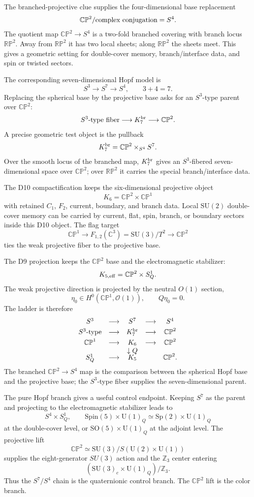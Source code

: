 \documentclass[11pt]{article}
\theoremstyle{definition}
\theoremstyle{remark}
\newcommand{\SU}{\mathrm{SU}}
\newcommand{\U}{\mathrm{U}}
\newcommand{\SO}{\mathrm{SO}}
\newcommand{\CP}{\mathbb{CP}}
\newcommand{\C}{\mathbb{C}}
\newcommand{\Z}{\mathbb{Z}}
\newcommand{\cO}{\mathcal O}
\begin{document}
The branched-projective clue supplies the four-dimensional base replacement
\[
  \CP^2/\hbox{complex conjugation}=S^4.
\]
The quotient map \(\CP^2\to S^4\) is a two-fold branched covering with branch
locus \(\mathbb{RP}^2\).  Away from \(\mathbb{RP}^2\) it has two local sheets;
along \(\mathbb{RP}^2\) the sheets meet.  This gives a geometric setting for
double-cover memory, branch/interface data, and spin or twisted sectors.

The corresponding seven-dimensional Hopf model is
\[
  S^3\longrightarrow S^7\longrightarrow S^4,
  \qquad 3+4=7.
\]
Replacing the spherical base by the projective base asks for an
\(S^3\)-type parent over \(\CP^2\):
\[
  S^3\hbox{-type fiber}\longrightarrow K_7^{\rm br}\longrightarrow\CP^2.
\]
A precise geometric test object is the pullback
\[
  K_7^{\rm br}=\CP^2\times_{S^4}S^7.
\]
Over the smooth locus of the branched map, \(K_7^{\rm br}\) gives an
\(S^3\)-fibered seven-dimensional space over \(\CP^2\); over
\(\mathbb{RP}^2\) it carries the special branch/interface data.

The D10 compactification keeps the six-dimensional projective object
\[
  K_6=\CP^2\times\CP^1
\]
with retained \(C_1\), \(F_2\), current, boundary, and branch data.  Local
\(\SU(2)\) double-cover memory can be carried by current, flat, spin, branch,
or boundary sectors inside this D10 object.  The flag target
\[
  \CP^1\longrightarrow F_{1,2}(\C^3)=\SU(3)/T^2\longrightarrow\CP^2
\]
ties the weak projective fiber to the projective base.

The D9 projection keeps the \(\CP^2\) base and the electromagnetic stabilizer:
\[
  K_{5,{\rm eff}}=\CP^2\times S^1_Q.
\]
The weak projective direction is projected by the neutral \(O(1)\) section,
\[
  \eta_0\in H^0(\CP^1,\cO(1)),
  \qquad Q\eta_0=0.
\]
The ladder is therefore
\[
\begin{array}{ccccc}
S^3 &\longrightarrow& S^7 &\longrightarrow& S^4\\[1mm]
S^3\hbox{-type} &\longrightarrow& K_7^{\rm br} &\longrightarrow& \CP^2\\[1mm]
\CP^1 &\longrightarrow& K_6 &\longrightarrow& \CP^2\\
&& \downarrow Q &&\\[-1mm]
S^1_Q &\longrightarrow& K_5 && \CP^2 .
\end{array}
\]
The branched \(\CP^2\to S^4\) map is the comparison between the spherical
Hopf base and the projective base; the \(S^3\)-type fiber supplies the
seven-dimensional parent.

The pure Hopf branch gives a useful control endpoint.  Keeping \(S^7\) as the
parent and projecting to the electromagnetic stabilizer leads to
\[
  S^4\times S^1_Q,
  \qquad
  \mathrm{Spin}(5)\times\U(1)_Q\simeq \mathrm{Sp}(2)\times\U(1)_Q
\]
at the double-cover level, or \(\SO(5)\times\U(1)_Q\) at the adjoint level.
The projective lift
\[
  \CP^2\simeq \SU(3)/S(\U(2)\times\U(1))
\]
supplies the eight-generator \(SU(3)\) action and the \(\Z_3\) center entering
\[
  (\SU(3)_c\times\U(1)_Q)/\Z_3.
\]
Thus the \(S^7/S^4\) chain is the quaternionic control branch.  The \(\CP^2\)
lift is the color branch.
\end{document}
